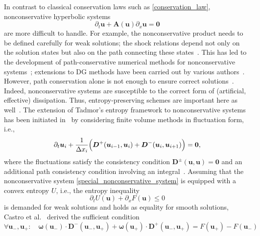 \documentclass[]{scrartcl}
\renewcommand{\vec}[1]{\boldsymbol{#1}}
\theoremstyle{definition}
\begin{document}
In contrast to classical conservation laws such as \eqref{conservation_law}, nonconservative hyperbolic systems
\begin{equation}
\partial_t \vec{u} + \vec{A}(\vec{u}) \partial_x \vec{u} = \vec{0}
\label{special_nonconservative_system}
\end{equation}
are more difficult to handle.
For example, the nonconservative product needs to be defined carefully for weak solutions; the shock relations depend not only on the solution states but also on the path connecting these states~\cite{Maso1995DefinitionAW}.
This has led to the development of path-conservative numerical methods for nonconservative systems~\cite{Pares2006}; extensions to DG methods have been carried out by various authors~\cite{RHEBERGEN20081887,FRANQUET20124096}.
However, path conservation alone is not enough to ensure correct solutions~\cite{CASTRO20088107,ABGRALL20102759}.
Indeed, nonconservative systems are susceptible to the correct form of (artificial, effective) dissipation.
Thus, entropy-preserving schemes are important here as well~\cite{Castro2013,beljadid2017schemes}.
The extension of Tadmor's entropy framework to nonconservative systems has been initiated in~\cite{Castro2013} by considering finite volume methods in fluctuation form, i.e.,
\begin{equation}
	\partial_t \vec{u}_i
    + \frac{1}{\Delta x_i} \Bigl (
        \vec{D}^+( \vec{u}_{i-1}, \vec{u}_{i} ) +
        \vec{D}^-( \vec{u}_{i}, \vec{u}_{i+1} )
    \Bigr ) = \vec{0},
	\label{FV_fluctuations}
\end{equation}
where the fluctuations satisfy the consistency condition $\vec{D}^\pm(\vec{u}, \vec{u}) = \vec{0}$ and an additional path consistency condition involving an integral~\cite{Pares2006,Castro2013}.
Assuming that the nonconservative system \eqref{special_nonconservative_system} is equipped with a convex entropy $U$, i.e., the entropy inequality
\begin{equation}
    \partial_t U(\vec{u}) + \partial_x F(\vec{u}) \leq 0
\end{equation}
is demanded for weak solutions and holds as equality for smooth solutions, Castro et al.~\cite[Theorem~2.1]{Castro2013} derived the sufficient condition
\begin{equation}
    \forall \vec{u}_-, \vec{u}_+\colon \quad
    \vec{\omega}(\vec{u}_-) \cdot \vec{D}^-( \vec{u}_{-}, \vec{u}_{+} )
    + \vec{\omega}(\vec{u}_+) \cdot \vec{D}^+( \vec{u}_{-}, \vec{u}_{+} )
    = F(\vec{u}_+) - F(\vec{u}_-)
    \label{CastroEC}
\end{equation}
\end{document}
